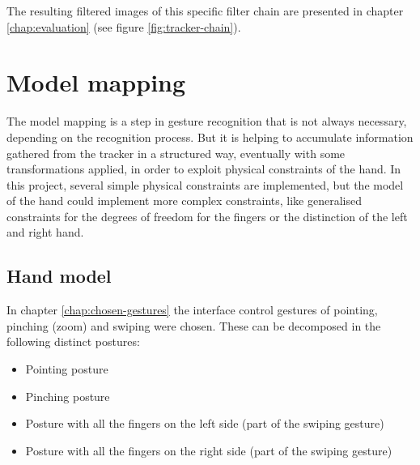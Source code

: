 The resulting filtered images of this specific filter chain are presented in chapter \ref{chap:evaluation} (see figure \ref{fig:tracker-chain}).

\section{Model mapping}
\label{sec:model-mapping}

The model mapping is a step in gesture recognition that is not always necessary, depending on the recognition process. But it is helping to accumulate information gathered from the tracker in a structured way, eventually with some transformations applied, in order to exploit physical constraints of the hand. 
In this project, several simple physical constraints are implemented, but the model of the hand could implement more complex constraints, like generalised constraints for the degrees of freedom for the fingers or the distinction of the left and right hand.

\subsection{Hand model}
\label{sub:hand-model}

In chapter \ref{chap:chosen-gestures} the interface control gestures of pointing, pinching (zoom) and swiping were chosen. These can be decomposed in the following distinct postures:
\begin{itemize}
\item Pointing posture
\item Pinching posture
\item Posture with all the fingers on the left side (part of the swiping gesture)
\item Posture with all the fingers on the right side (part of the swiping gesture)
\end{itemize}

